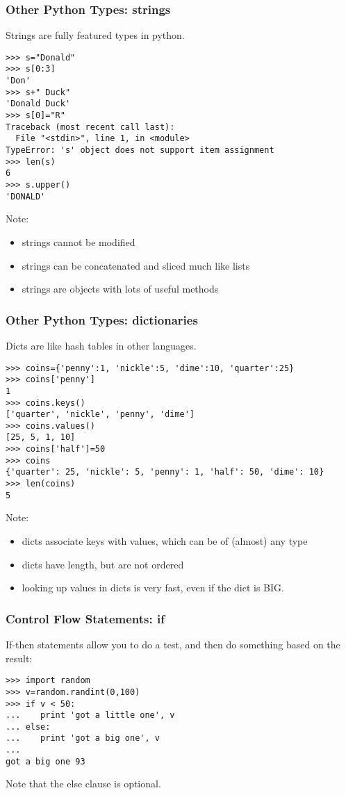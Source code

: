 \documentclass[10pt]{beamer}
\begin{document}
\begin{frame}[fragile]
\frametitle{Other Python Types: strings}

Strings are fully featured types in python.

\begin{verbatim}
>>> s="Donald"
>>> s[0:3]
'Don'
>>> s+" Duck"
'Donald Duck'
>>> s[0]="R"
Traceback (most recent call last):
  File "<stdin>", line 1, in <module>
TypeError: 's' object does not support item assignment
>>> len(s)
6
>>> s.upper()
'DONALD'
\end{verbatim}

Note:
\begin{itemize}
\item strings cannot be modified
\item strings can be concatenated and sliced much like lists
\item strings are objects with lots of useful methods
\end{itemize}

\end{frame}


\begin{frame}[fragile]
\frametitle{Other Python Types: dictionaries}

Dicts are like hash tables in other languages.  
\begin{verbatim}
>>> coins={'penny':1, 'nickle':5, 'dime':10, 'quarter':25}
>>> coins['penny']
1
>>> coins.keys()
['quarter', 'nickle', 'penny', 'dime']
>>> coins.values()
[25, 5, 1, 10]
>>> coins['half']=50
>>> coins
{'quarter': 25, 'nickle': 5, 'penny': 1, 'half': 50, 'dime': 10}
>>> len(coins)
5
\end{verbatim}

Note:
\begin{itemize}
\item dicts associate keys with values, which can be of (almost) any type 
\item dicts have length, but are not ordered
\item looking up values in dicts is very fast, even if the dict is BIG.
\end{itemize}

\end{frame}

\begin{frame}[fragile]
\frametitle{Control Flow Statements: if}

If-then statements allow you to do a test, and then do something
based on the result:

\begin{verbatim}
>>> import random
>>> v=random.randint(0,100)
>>> if v < 50:
...    print 'got a little one', v
... else:
...    print 'got a big one', v
... 
got a big one 93
\end{verbatim}

Note that the else clause is optional.

\end{frame}
\end{document}
